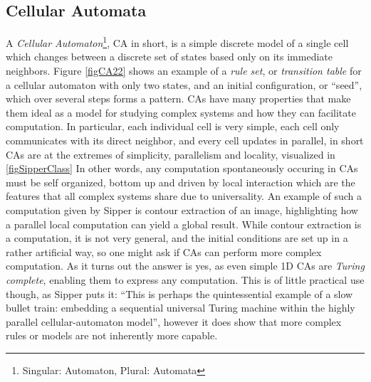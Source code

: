 \subsection{Cellular Automata}
A \emph{Cellular Automaton}\footnote{Singular: Automaton, Plural: Automata}, CA
in short, is a simple discrete model of a single cell which changes between a
discrete set of states based only on its immediate neighbors.
Figure \ref{figCA22} shows an example of a \emph{rule set}, or \emph{transition
  table} for a cellular automaton with only two states, and an initial
configuration, or ``seed'', which over several steps forms a pattern.
%
CAs have many properties that make them ideal as a model for studying complex
systems and how they can facilitate computation.
In particular, each individual cell is very simple, each cell only communicates
with its direct neighbor, and every cell updates in parallel, in short CAs
are at the extremes of simplicity, parallelism and locality, visualized in
\ref{figSipperClass}
%
In other words, any computation spontaneously occuring in CAs must be self
organized, bottom up and driven by local interaction which are the features that
all complex systems share due to universality.
%
An example of such a computation given by Sipper is contour extraction of an
image, highlighting how a parallel local computation can yield a global result.
%
While contour extraction is a computation, it is not very general, and the initial
conditions are set up in a rather artificial way, so one might ask if CAs can
perform more complex computation.
As it turns out the answer is yes, as even simple 1D CAs are \emph{Turing
  complete}, enabling them to express any computation.
This is of little practical use though, as Sipper puts it: ``This is perhaps the
quintessential example of a slow bullet train: embedding a sequential universal
Turing machine within the highly parallel cellular-automaton model'', however it
does show that more complex rules or models are not inherently more capable.
